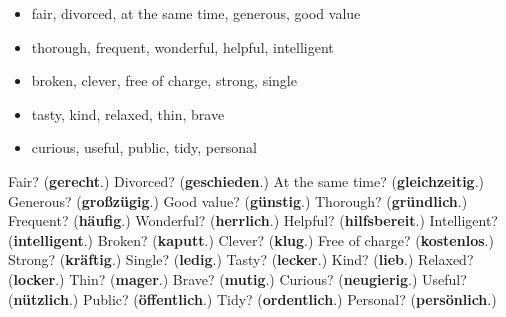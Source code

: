 \begin{itemize}
\raggedright
  \item fair, divorced, at the same time, generous, good value
  \item thorough, frequent, wonderful, helpful, intelligent
  \item broken, clever, free of charge, strong, single
  \item tasty, kind, relaxed, thin, brave
  \item curious, useful, public, tidy, personal
\end{itemize}

\begin{tcolorbox}[breakable,colback=teal!4,colframe=teal!35!black,title={Before you move on}]
Fair? (\textbf{gerecht}.) Divorced? (\textbf{geschieden}.) At the same time? (\textbf{gleichzeitig}.) Generous? (\textbf{großzügig}.) Good value? (\textbf{günstig}.) Thorough? (\textbf{gründlich}.) Frequent? (\textbf{häufig}.) Wonderful? (\textbf{herrlich}.) Helpful? (\textbf{hilfsbereit}.) Intelligent? (\textbf{intelligent}.) Broken? (\textbf{kaputt}.) Clever? (\textbf{klug}.) Free of charge? (\textbf{kostenlos}.) Strong? (\textbf{kräftig}.) Single? (\textbf{ledig}.) Tasty? (\textbf{lecker}.) Kind? (\textbf{lieb}.) Relaxed? (\textbf{locker}.) Thin? (\textbf{mager}.) Brave? (\textbf{mutig}.) Curious? (\textbf{neugierig}.) Useful? (\textbf{nützlich}.) Public? (\textbf{öffentlich}.) Tidy? (\textbf{ordentlich}.) Personal? (\textbf{persönlich}.)
\end{tcolorbox}
